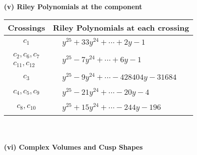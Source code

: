 \documentclass[1p]{elsarticle_modified}
\theoremstyle{definition}
\begin{document}
\newpage\renewcommand{\arraystretch}{1}
\flushleft \textbf{(v) Riley Polynomials at the component}\newline \\
\begin{tabular}{m{50pt}|m{274pt}}
Crossings & \hspace{64pt}Riley Polynomials at each crossing \\
\hline $$\begin{aligned}c_{1}\end{aligned}$$&$\begin{aligned}
&y^{25}+33 y^{24}+\cdots+2 y-1
\end{aligned}$\\
\hline $$\begin{aligned}c_{2},c_{6},c_{7}\\c_{11},c_{12}\end{aligned}$$&$\begin{aligned}
&y^{25}-7 y^{24}+\cdots+6 y-1
\end{aligned}$\\
\hline $$\begin{aligned}c_{3}\end{aligned}$$&$\begin{aligned}
&y^{25}-9 y^{24}+\cdots-428404 y-31684
\end{aligned}$\\
\hline $$\begin{aligned}c_{4},c_{5},c_{9}\end{aligned}$$&$\begin{aligned}
&y^{25}-21 y^{24}+\cdots-20 y-4
\end{aligned}$\\
\hline $$\begin{aligned}c_{8},c_{10}\end{aligned}$$&$\begin{aligned}
&y^{25}+15 y^{24}+\cdots-244 y-196
\end{aligned}$\\
\hline
\end{tabular}\\~\\
\newpage\flushleft \textbf{(vi) Complex Volumes and Cusp Shapes}
\end{document}
